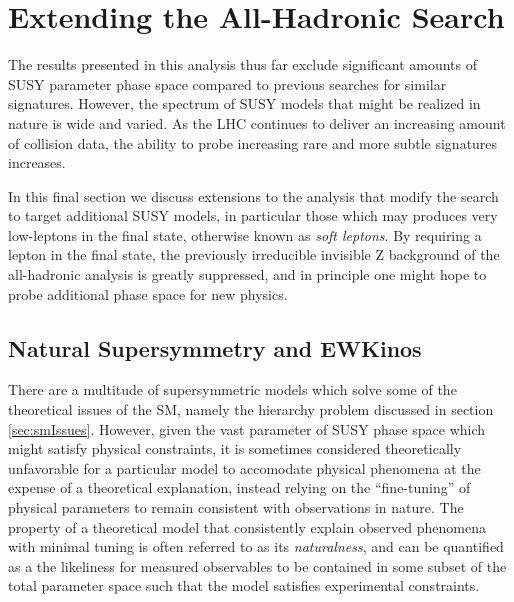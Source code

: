 \chapter{Extending the All-Hadronic Search}
\label{ch:soft}

The results presented in this analysis thus far exclude significant amounts of SUSY parameter phase space compared to previous searches for similar signatures. However, the spectrum of SUSY models that might be realized in nature is wide and varied. As the LHC continues to deliver an increasing amount of collision data, the ability to probe increasing rare and more subtle signatures increases. 

In this final section we discuss extensions to the \mttwo analysis that modify the search to target additional SUSY models, in particular those which may produces very low-\pt leptons in the final state, otherwise known as {\it soft leptons}. By requiring a lepton in the final state, the previously irreducible invisible Z background of the all-hadronic analysis is greatly suppressed, and in principle one might hope to probe additional phase space for new physics.

\section{Natural Supersymmetry and EWKinos}
\label{sec:natural}

There are a multitude of supersymmetric models which solve some of the theoretical issues of the SM, namely the hierarchy problem discussed in section \ref{sec:smIssues}. However, given the vast parameter of SUSY phase space which might satisfy physical constraints, it is sometimes considered theoretically unfavorable for a particular model to accomodate physical phenomena at the expense of a theoretical explanation, instead relying on the ``fine-tuning'' of physical parameters to remain consistent with observations in nature. The property of a theoretical model that consistently explain observed phenomena with minimal tuning is often referred to as its {\it naturalness}, and can be quantified as a the likeliness for measured observables to be contained in some subset of the total parameter space such that the model satisfies experimental constraints.

